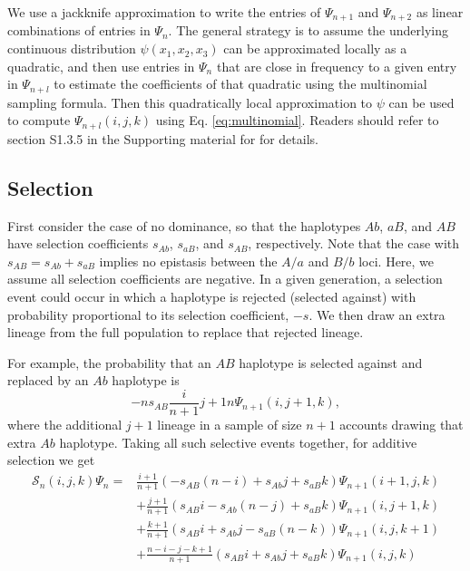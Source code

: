 \documentclass[]{article}
\begin{document}
We use a jackknife approximation to write the entries of \(\Psi_{n+1}\) and
\(\Psi_{n+2}\) as linear combinations of entries in \(\Psi_n\). The general
strategy is to assume the underlying continuous distribution \(\psi(x_1, x_2, x_3)\) can be approximated locally as a quadratic, and then use entries in
\(\Psi_n\) that are close in frequency to a given entry in \(\Psi_{n+l}\) to
estimate the coefficients of that quadratic using the multinomial sampling
formula. Then this quadratically local approximation to \(\psi\) can be used to
compute \(\Psi_{n+l}(i, j, k)\) using Eq. \eqref{eq:multinomial}. Readers should
refer to section S1.3.5 in the Supporting material for \citet{Ragsdale2019-nt} for
details.

\subsection{Selection}

First consider the case of no dominance, so that the haplotypes \(Ab\), \(aB\),
and \(AB\) have selection coefficients \(s_{Ab}\), \(s_{aB}\), and \(s_{AB}\),
respectively. Note that the case with \(s_{AB} = s_{Ab} + s_{aB}\) implies no
epistasis between the \(A/a\) and \(B/b\) loci. Here, we assume all selection
coefficients are negative. In a given generation, a selection event could
occur in which a haplotype is rejected (selected against) with probability
proportional to its selection coefficient, \(-s\). We then draw an extra lineage
from the full population to replace that rejected lineage.

For example, the probability that an \(AB\) haplotype is selected against and
replaced by an \(Ab\) haplotype is \[-ns_{AB} \frac{i}{n+1}{j+1}{n}\Psi_{n+1}(i,
j + 1, k),\] where the additional \(j + 1\) lineage in a sample of size \(n + 1\)
accounts drawing that extra \(Ab\) haplotype. Taking all such selective events
together, for additive selection we get
\begin{align}
\mathcal{S}_{n}(i, j, k)\Psi_n = &
\frac{i+1}{n+1}\left(-s_{AB}(n-i) + s_{Ab}j
+ s_{aB}k\right)\Psi_{n+1}(i+1, j, k) \\\nonumber
& +\frac{j+1}{n+1}\left(s_{AB}i - s_{Ab}(n-j)
+ s_{aB}k\right)\Psi_{n+1}(i, j+1, k) \\\nonumber
& +\frac{k+1}{n+1}\left(s_{AB}i + s_{Ab}j
- s_{aB}(n-k)\right)\Psi_{n+1}(i, j, k+1) \\\nonumber
& + \frac{n-i-j-k+1}{n+1}\left(s_{AB}i + s_{Ab}j
+ s_{aB}k\right)\Psi_{n+1}(i, j, k)
\end{align}
\end{document}
